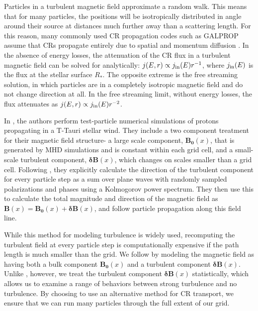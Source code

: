 \documentclass[twocolumn]{aastex63}
\begin{document}
Particles in a turbulent magnetic field approximate a random walk. This means that for many particles, the positions will be isotropically distributed in angle around their source at distances much further away than a scattering length. For this reason, many commonly used CR propagation codes such as GALPROP assume that CRs propagate entirely due to spatial and momentum diffusion \citep{strong_1998_galprop}. In the absence of energy losses, the attenuation of the CR flux in a turbulent magnetic field can be solved for analytically: $j(E,r)\propto j_{\rm in}(E) r^{-1}$, where $j_{\rm in}(E)$ is the flux at the stellar surface $R_*$. The opposite extreme is the free streaming solution, in which particles are in a completely isotropic magnetic field and do not change direction at all. In the free streaming limit, without energy losses, the flux attenuates as $j(E,r)\propto j_{\rm in}(E) r^{-2}$. 

In \cite{fraschetti_2018_mottled}, the authors perform test-particle numerical simulations of protons propagating in a T-Tauri stellar wind. They include a two component treatment for their magnetic field structure- a large scale component, $\boldsymbol{B_0}(x)$, that is generated by MHD simulations and is constant within each grid cell, and a small-scale turbulent component, $\boldsymbol{\delta B}(x)$, which changes on scales smaller than a grid cell. Following \cite{giacolone_1999_turbulence}, they explicitly calculate the direction of the turbulent component for every particle step as a sum over plane waves with randomly sampled polarizations and phases using a Kolmogorov power spectrum. They then use this to calculate the total magnitude and direction of the magnetic field as $\boldsymbol{B}(x) = \boldsymbol{B_0}(x)+ \boldsymbol{\delta B}(x)$, and follow particle propagation along this field line.

While this method for modeling turbulence is widely used, recomputing the turbulent field at every particle step is computationally expensive if the path length is much smaller than the grid. We follow \cite{fraschetti_2018_mottled} by modeling the magnetic field as having both a bulk component $\boldsymbol{B_0}(x)$ and a turbulent component $\boldsymbol{\delta B}(x)$. Unlike \cite{fraschetti_2018_mottled}, however, we treat the turbulent component $\boldsymbol{\delta B}(x)$ statistically, which allows us to examine a range of behaviors between strong turbulence and no turbulence. By choosing to use an alternative method for CR transport, we ensure that we can run many particles through the full extent of our grid. 
\end{document}
